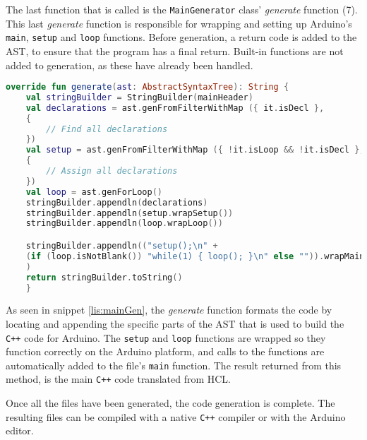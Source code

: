 The last function that is called is the \texttt{MainGenerator} class' \textit{generate} function (7). 
This last \textit{generate} function is responsible for wrapping and setting up Arduino's \texttt{main}, \texttt{setup} and \texttt{loop} functions.
Before generation, a return code is added to the AST, to ensure that the program has a final return.
Built-in functions are not added to generation, as these have already been handled. 

\begin{lstlisting}[language=Kotlin,label=lis:mainGen,caption=The implementation of \textit{generate} in \texttt{MainGenerator}.]
override fun generate(ast: AbstractSyntaxTree): String {
	val stringBuilder = StringBuilder(mainHeader)
	val declarations = ast.genFromFilterWithMap ({ it.isDecl }, 
	{
		// Find all declarations	
	})
	val setup = ast.genFromFilterWithMap ({ !it.isLoop && !it.isDecl }, 
	{
	    // Assign all declarations
	})
	val loop = ast.genForLoop()
	stringBuilder.appendln(declarations)
	stringBuilder.appendln(setup.wrapSetup())
	stringBuilder.appendln(loop.wrapLoop())

	stringBuilder.appendln(("setup();\n" +
	(if (loop.isNotBlank()) "while(1) { loop(); }\n" else "")).wrapMain()
	)
	return stringBuilder.toString()
	}
\end{lstlisting}

As seen in snippet \ref{lis:mainGen}, the \textit{generate} function formats the code by locating and appending the specific parts of the AST that is used to build the \texttt{C++} code for Arduino.
The \texttt{setup} and \texttt{loop} functions are wrapped so they function correctly on the Arduino platform, and calls to the functions are automatically added to the file's \texttt{main} function. 
The result returned from this method, is the main \texttt{C++} code translated from HCL. 

Once all the files have been generated, the code generation is complete.
The resulting files can be compiled with a native \texttt{C++} compiler or with the Arduino editor.
